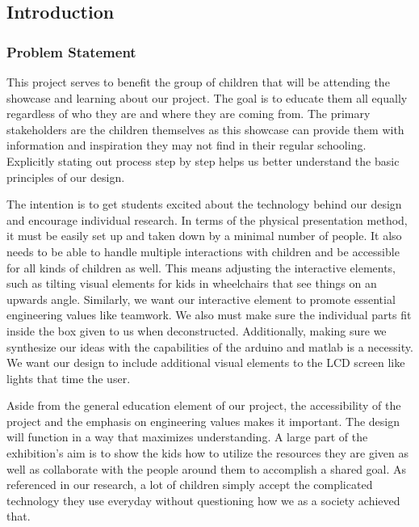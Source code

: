 \documentclass[conference]{IEEEtran}
\begin{document}
\subsection{Introduction}

\subsubsection{Problem Statement} \label{ps}

\par This project serves to benefit the group of children that will be attending the showcase and learning about our project. The goal is to educate them all equally regardless of who they are and where they are coming from. The primary stakeholders are the children themselves as this showcase can provide them with information and inspiration they may not find in their regular schooling. Explicitly stating out process step by step helps us better understand the basic principles of our design.
\par The intention is to get students excited about the technology behind our design and encourage individual research. In terms of the physical presentation method, it must be easily set up and taken down by a minimal number of people. It also needs to be able to handle multiple interactions with children and be accessible for all kinds of children as well. This means adjusting the interactive elements, such as tilting visual elements for kids in wheelchairs that see things on an upwards angle. Similarly, we want our interactive element to promote essential engineering values like teamwork. We also must make sure the individual parts fit inside the box given to us when deconstructed. Additionally, making sure we synthesize our ideas with the capabilities of the arduino and matlab is a necessity. We want  our design to include additional visual elements to the LCD screen like lights that time the user. 
\par Aside from the general education element of our project, the accessibility of the project and the emphasis on engineering values makes it important. The design will function in a way that maximizes understanding. A large part of the exhibition's aim is to show the kids how to utilize the resources they are given as well as collaborate with the people around them to accomplish a shared goal. As referenced in our research, a lot of children simply accept the complicated technology they use everyday without questioning how we as a society achieved that.
\end{document}
